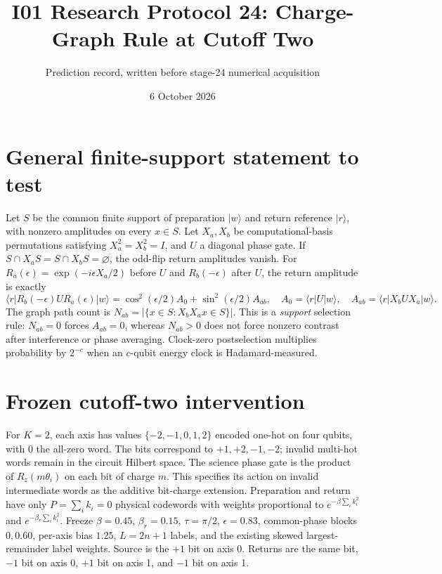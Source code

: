 \documentclass[10pt,a4paper]{article}
\title{I01 Research Protocol 24: Charge-Graph Rule at Cutoff Two}
\author{Prediction record, written before stage-24 numerical acquisition}
\date{6 October 2026}
\begin{document}
\maketitle
\vspace{-2em}

\section*{General finite-support statement to test}
Let $S$ be the common finite support of preparation $|w\rangle$ and return reference $|r\rangle$, with nonzero amplitudes on every $x\in S$. Let $X_a,X_b$ be computational-basis permutations satisfying $X_a^2=X_b^2=I$, and $U$ a diagonal phase gate. If $S\cap X_aS=S\cap X_bS=\varnothing$, the odd-flip return amplitudes vanish. For $R_a(\epsilon)=\exp(-i\epsilon X_a/2)$ before $U$ and $R_b(-\epsilon)$ after $U$, the return amplitude is exactly
\[
\langle r|R_b(-\epsilon)UR_a(\epsilon)|w\rangle
=\cos^2(\epsilon/2)A_0+\sin^2(\epsilon/2)A_{ab},
\quad A_0=\langle r|U|w\rangle,\quad A_{ab}=\langle r|X_bUX_a|w\rangle.
\]
The graph path count is $N_{ab}=|\{x\in S:X_bX_ax\in S\}|$. This is a \emph{support} selection rule: $N_{ab}=0$ forces $A_{ab}=0$, whereas $N_{ab}>0$ does not force nonzero contrast after interference or phase averaging. Clock-zero postselection multiplies probability by $2^{-c}$ when an $c$-qubit energy clock is Hadamard-measured.

\section*{Frozen cutoff-two intervention}
For $K=2$, each axis has values $\{-2,-1,0,1,2\}$ encoded one-hot on four qubits, with 0 the all-zero word. The bits correspond to $+1,+2,-1,-2$; invalid multi-hot words remain in the circuit Hilbert space. The science phase gate is the product of $R_z(m\theta_i)$ on each bit of charge $m$. This specifies its action on invalid intermediate words as the additive bit-charge extension. Preparation and return have only $P=\sum_i k_i=0$ physical codewords with weights proportional to $e^{-\beta\sum_i k_i^2}$ and $e^{-\beta_r\sum_i k_i^2}$. Freeze $\beta=0.45$, $\beta_r=0.15$, $\tau=\pi/2$, $\epsilon=0.83$, common-phase blocks $0,0.60$, per-axis bias $1.25$, $L=2n+1$ labels, and the existing skewed largest-remainder label weights. Source is the $+1$ bit on axis 0. Returns are the same bit, $-1$ bit on axis 0, $+1$ bit on axis 1, and $-1$ bit on axis 1.
\end{document}
